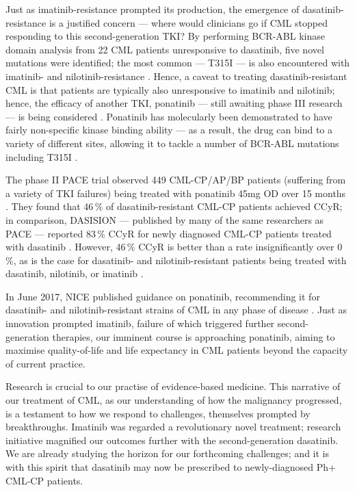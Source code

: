 Just as imatinib-resistance prompted its production, the emergence of dasatinib-resistance is a justified concern --- where would clinicians go if CML stopped responding to this second-generation TKI? By performing BCR-ABL kinase domain analysis from 22 CML patients unresponsive to dasatinib, five novel mutations were identified; the most common --- T315I --- is also encountered with imatinib- and nilotinib-resistance \citep{RefWorks:doc:585ba6dde4b05e0ea0615ea0}. Hence, a caveat to treating dasatinib-resistant CML is that patients are typically also unresponsive to imatinib and nilotinib; hence, the efficacy of another TKI, ponatinib --- still awaiting phase III research --- is being considered \citep{RefWorks:doc:5863a058e4b0147c58332219}. Ponatinib has molecularly been demonstrated to have fairly non-specific kinase binding ability --- as a result, the drug can bind to a variety of different sites, allowing it to tackle a number of BCR-ABL mutations including T315I \citep{RefWorks:doc:59ac7919e4b07cfb2e760c36}.

The phase II PACE trial observed 449 CML-CP/AP/BP patients (suffering from a variety of TKI failures) being treated with ponatinib 45mg OD over 15 months \citep{RefWorks:doc:5863a4b4e4b05e0ea061e44d}. They found that 46\,\% of dasatinib-resistant CML-CP patients achieved CCyR; in comparison, DASISION --- published by many of the same researchers as PACE --- reported 83\,\% CCyR for newly diagnosed CML-CP patients treated with dasatinib \citep{RefWorks:doc:58564bd8e4b0f87b6b283223}. However, 46\,\% CCyR is better than a rate insignificantly over 0\,\%, as is the case for dasatinib- and nilotinib-resistant patients being treated with dasatinib, nilotinib, or imatinib \citep{RefWorks:doc:5863a4b4e4b05e0ea061e44d}.

In June 2017, NICE published guidance on ponatinib, recommending it for dasatinib- and nilotinib-resistant strains of CML in any phase of disease \citep{RefWorks:doc:5863a9a2e4b001981459f37f}. Just as innovation prompted imatinib, failure of which triggered further second-generation therapies, our imminent course is approaching ponatinib, aiming to maximise quality-of-life and life expectancy in CML patients beyond the capacity of current practice.

Research is crucial to our practise of evidence-based medicine. This narrative of our treatment of CML, as our understanding of how the malignancy progressed, is a testament to how we respond to challenges, themselves prompted by breakthroughs. Imatinib was regarded a revolutionary novel treatment; research initiative magnified our outcomes further with the second-generation dasatinib. We are already studying the horizon for our forthcoming challenges; and it is with this spirit that dasatinib may now be prescribed to newly-diagnosed Ph+ CML-CP patients.

